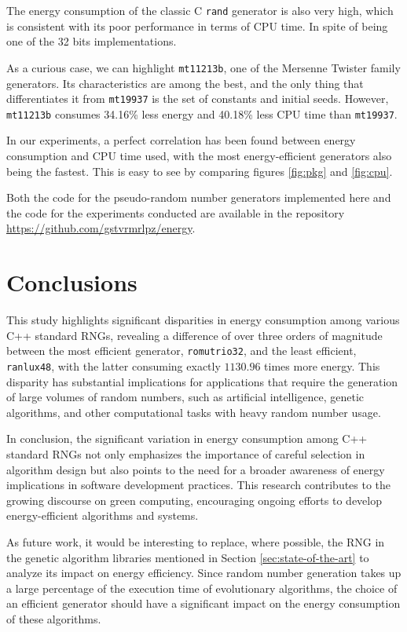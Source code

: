 \documentclass[dvipsnames,format=sigconf]{acmart}
\begin{document}
The energy consumption of the classic C \texttt{rand} generator is also very high, which is consistent with its poor performance in terms of CPU time. In spite of being one of the 32 bits implementations.

As a curious case, we can highlight \texttt{mt11213b}, one of the Mersenne Twister family generators. Its characteristics are among the best, and the only thing that differentiates it from \texttt{mt19937} is the set of constants and initial seeds. However, \texttt{mt11213b} consumes 34.16\% less energy and 40.18\% less CPU time than \texttt{mt19937}.

In our experiments, a perfect correlation has been found between energy consumption and CPU time used, with the most energy-efficient generators also being the fastest. This is easy to see by comparing figures \ref{fig:pkg} and \ref{fig:cpu}.

Both the code for the pseudo-random number generators implemented here and the code for the experiments conducted are available in the repository \url{https://github.com/gstvrmrlpz/energy}.

\section{Conclusions}
\label{sec:conclusions}

This study highlights significant disparities in energy consumption among various C++ standard RNGs, revealing a difference of over three orders of magnitude between the most efficient generator, \texttt{romutrio32}, and the least efficient, \texttt{ranlux48}, with the latter consuming exactly $1130.96$ times more energy. This disparity has substantial implications for applications that require the generation of large volumes of random numbers, such as artificial intelligence, genetic algorithms, and other computational tasks with heavy random number usage.

In conclusion, the significant variation in energy consumption among C++ standard RNGs not only emphasizes the importance of careful selection in algorithm design but also points to the need for a broader awareness of energy implications in software development practices. This research contributes to the growing discourse on green computing, encouraging ongoing efforts to develop energy-efficient algorithms and systems.

As future work, it would be interesting to replace, where possible, the RNG in the genetic algorithm libraries mentioned in Section \ref{sec:state-of-the-art} to analyze its impact on energy efficiency. Since random number generation takes up a large percentage of the execution time of evolutionary algorithms, the choice of an efficient generator should have a significant impact on the energy consumption of these algorithms.
\end{document}
